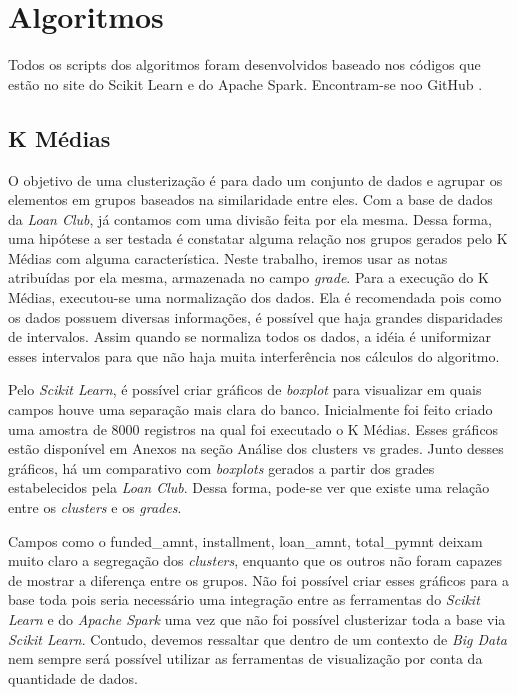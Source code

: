 \section{Algoritmos}

Todos os scripts dos algoritmos foram desenvolvidos baseado nos códigos que estão no site do Scikit Learn e do Apache Spark. Encontram-se noo GitHub \cite{GIT}.

\subsection{K Médias}

O objetivo de uma clusterização é para dado um conjunto de dados e agrupar os elementos em grupos baseados na similaridade entre eles. Com a base de dados da \emph{Loan Club}, já contamos com uma divisão feita por ela mesma. Dessa forma, uma hipótese a ser testada é constatar alguma relação nos grupos gerados pelo K Médias com alguma característica. Neste trabalho, iremos usar as notas atribuídas por ela mesma, armazenada no campo \emph{grade}. Para a execução do K Médias, executou-se uma normalização dos dados. Ela é recomendada pois como os dados possuem diversas informações, é possível que haja grandes disparidades de intervalos. Assim quando se normaliza todos os dados, a idéia é uniformizar esses intervalos para que não haja muita interferência nos cálculos do algoritmo. 

Pelo \emph{Scikit Learn}, é possível criar gráficos de \emph{boxplot} para visualizar em quais campos houve uma separação mais clara do banco. Inicialmente foi feito criado uma amostra de 8000 registros na qual foi executado o K Médias. Esses gráficos estão disponível em Anexos na seção Análise dos clusters vs grades. Junto desses gráficos, há um comparativo com \emph{boxplots} gerados a partir dos grades estabelecidos pela \emph{Loan Club}. Dessa forma, pode-se ver que existe uma relação entre os \emph{clusters} e os \emph{grades}.

Campos como o funded\_amnt, installment, loan\_amnt, total\_pymnt deixam muito claro a segregação dos \emph{clusters}, enquanto que os outros não foram capazes de mostrar a diferença entre os grupos.
Não foi possível criar esses gráficos para a base toda pois seria necessário uma integração entre as ferramentas do \emph{Scikit Learn} e do \emph{Apache Spark} uma vez que não foi possível clusterizar toda a base via \emph{Scikit Learn}. Contudo, devemos ressaltar que dentro de um contexto de \emph{Big Data} nem sempre será possível utilizar as ferramentas de visualização por conta da quantidade de dados.


